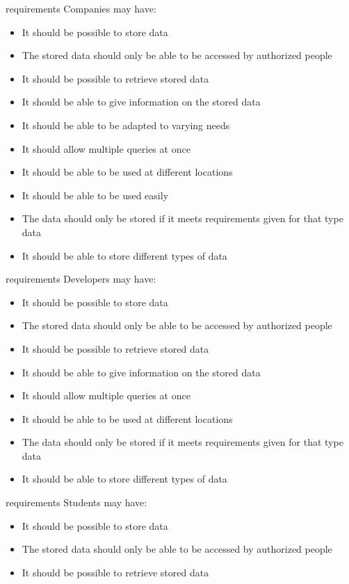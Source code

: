 \begin{elenco}
	

\item 
requirements Companies may have:
\begin{itemize}
    \item It should be possible to store data
    \item The stored data should only be able to be accessed by authorized people
    \item It should be possible to retrieve stored data
    \item It should be able to give information on the stored data
    \item It should be able to be adapted to varying needs
    \item It should allow multiple queries at once
    \item It should be able to be used at different locations
    \item It should be able to be used easily
    \item The data should only be stored if it meets requirements given for that type data
    \item It should be able to store different types of data
\end{itemize} 
requirements Developers may have:
\begin{itemize}
    \item It should be possible to store data
    \item The stored data should only be able to be accessed by authorized people
    \item It should be possible to retrieve stored data
    \item It should be able to give information on the stored data
    \item It should allow multiple queries at once
    \item It should be able to be used at different locations
    \item The data should only be stored if it meets requirements given for that type data
    \item It should be able to store different types of data
\end{itemize}
requirements Students may have:
\begin{itemize}
    \item It should be possible to store data
    \item The stored data should only be able to be accessed by authorized people
    \item It should be possible to retrieve stored data

\end{itemize}
\end{elenco}
